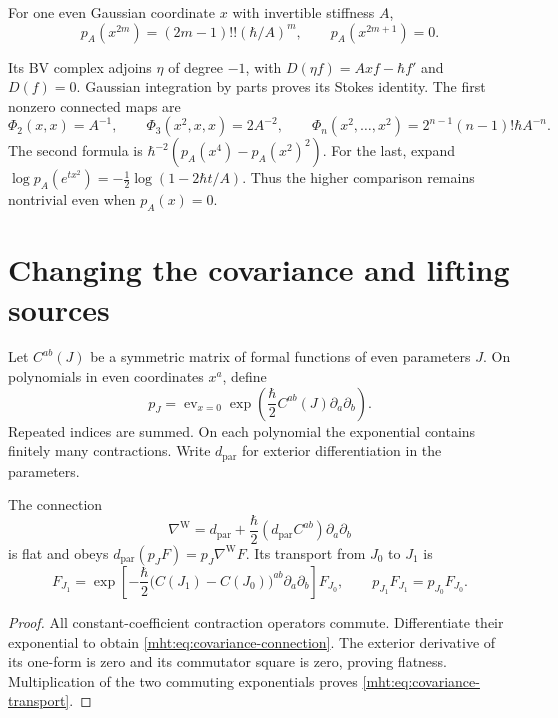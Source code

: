 \begin{example}\label{mht:ex:gaussian-cumulants}
For one even Gaussian coordinate $x$ with invertible stiffness $A$,
\[
 p_A(x^{2m})=(2m-1)!!(\hbar/A)^m,\qquad
 p_A(x^{2m+1})=0.
\]

Its BV complex adjoins $\eta$ of degree $-1$, with
$D(\eta f)=Axf-\hbar f'$ and $D(f)=0$. Gaussian integration by
parts proves its Stokes identity. The first nonzero connected maps are
\begin{equation}\label{mht:eq:composite-gaussian-cumulants}
 \Phi_2(x,x)=A^{-1},\qquad
 \Phi_3(x^2,x,x)=2A^{-2},\qquad
 \Phi_n(x^2,\ldots,x^2)=2^{n-1}(n-1)!\hbar A^{-n}.
\end{equation}
The second formula is
$\hbar^{-2}(p_A(x^4)-p_A(x^2)^2)$.
For the last, expand
$\log p_A(e^{t x^2})=-\tfrac12\log(1-2\hbar t/A)$.
Thus the higher comparison remains nontrivial even when $p_A(x)=0$.
\end{example}

\section{Changing the covariance and lifting sources}

Let $C^{ab}(J)$ be a symmetric matrix of formal functions of even
parameters $J$. On polynomials in even coordinates $x^a$, define
\[
 p_J=\operatorname{ev}_{x=0}
       \exp\left(\frac\hbar2 C^{ab}(J)\partial_a\partial_b\right).
\]
Repeated indices are summed. On each polynomial the exponential
contains finitely many contractions. Write $d_{\mathrm{par}}$ for
exterior differentiation in the parameters.

\begin{proposition}\label{mht:prop:covariance-connection}
The connection
\begin{equation}\label{mht:eq:covariance-connection}
 \nabla^{\mathrm W}=d_{\mathrm{par}}+
       \frac\hbar2(d_{\mathrm{par}}C^{ab})\partial_a\partial_b
\end{equation}
is flat and obeys $d_{\mathrm{par}}(p_JF)=p_J\nabla^{\mathrm W}F$.
Its transport from $J_0$ to $J_1$ is
\begin{equation}\label{mht:eq:covariance-transport}
 F_{J_1}=\exp\left[-\frac\hbar2
          \bigl(C(J_1)-C(J_0)\bigr)^{ab}\partial_a\partial_b\right]
          F_{J_0},\qquad p_{J_1}F_{J_1}=p_{J_0}F_{J_0}.
\end{equation}
\end{proposition}

\begin{proof}
All constant-coefficient contraction operators commute. Differentiate
their exponential to obtain \eqref{mht:eq:covariance-connection}.
The exterior derivative of its one-form is zero and its commutator
square is zero, proving flatness. Multiplication of the two commuting
exponentials proves \eqref{mht:eq:covariance-transport}.
\end{proof}

